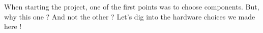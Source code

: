 When starting the project, one of the first points was to choose components. But, 
why this one ? And not the other ? Let's dig into the hardware choices we made here !


